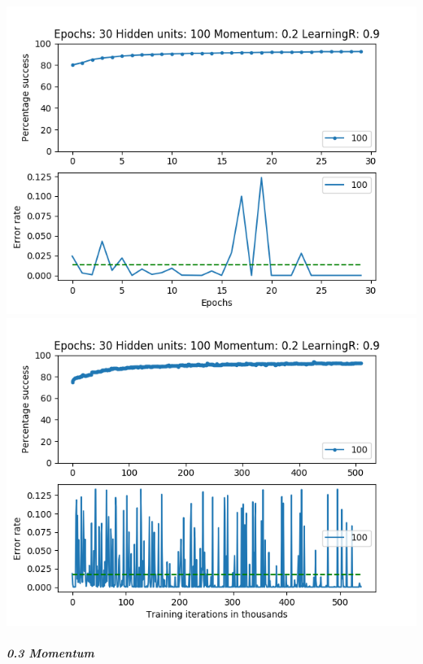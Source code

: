 \documentclass[11pt]{article}
\makeatletter
\def\maxwidth{\ifdim\Gin@nat@width>\linewidth\linewidth
    \else\Gin@nat@width\fi}
\let\Oldincludegraphics\includegraphics
\renewcommand{\includegraphics}[1]{\Oldincludegraphics[width=.8\maxwidth]{#1}}
\makeatother
\begin{document}
\includegraphics{Experiment2/E2_NN_Epoch_Momentum_0.2_30Epochs_100Hiddenunits.png}
\includegraphics{Experiment2/E2_NN_Training_Momentum_0.2_30Epochs_100Hiddenunits.png}

\hypertarget{momentum-3}{%
\subparagraph{0.3 Momentum}\label{momentum-3}}
\end{document}
